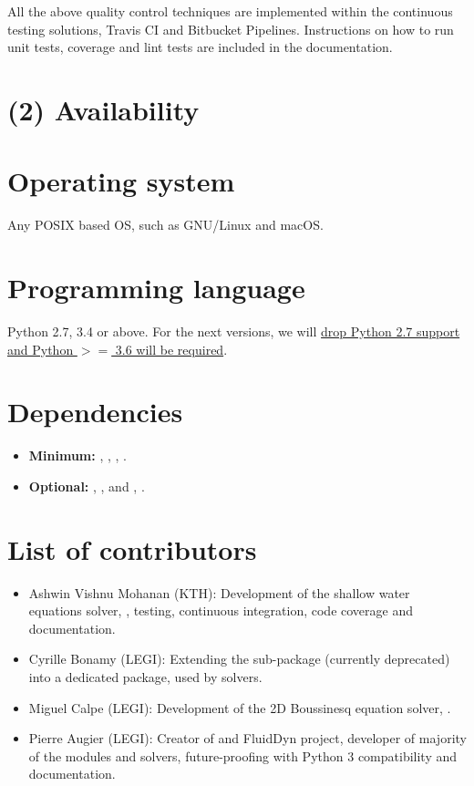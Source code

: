 All the above quality control techniques are implemented within the continuous
testing solutions, Travis CI and Bitbucket Pipelines. Instructions on how to
run unit tests, coverage and lint tests are included in the documentation.

\section{(2) Availability}
\vspace{0.5cm}
\section{Operating system}

Any POSIX based OS, such as GNU/Linux and macOS.

\section{Programming language}

Python 2.7, 3.4 or above. For the next versions, we will
\href{https://python3statement.org/}{drop Python 2.7 support and Python $>=$
3.6 will be required}.

\section{Dependencies}

\begin{itemize}
\item {\bf Minimum:} , \Numpy, , 
\cite[and FFT libraries, see][]{fluidfft}.
\item {\bf Optional:} \Scipy, ,  and
, .
\end{itemize}

\section{List of contributors}

\begin{itemize}
\item Ashwin Vishnu Mohanan (KTH): Development of the shallow water equations
solver, , testing, continuous integration,
code coverage and documentation.
\item Cyrille Bonamy (LEGI): Extending the sub-package
 (currently deprecated) into a
dedicated package,  used by  solvers.
\item Miguel Calpe (LEGI): Development of the 2D Boussinesq equation solver,
.
\item Pierre Augier (LEGI): Creator of  and FluidDyn project,
developer of majority of the modules and solvers, future-proofing with Python 3
compatibility and documentation.
\end{itemize}


